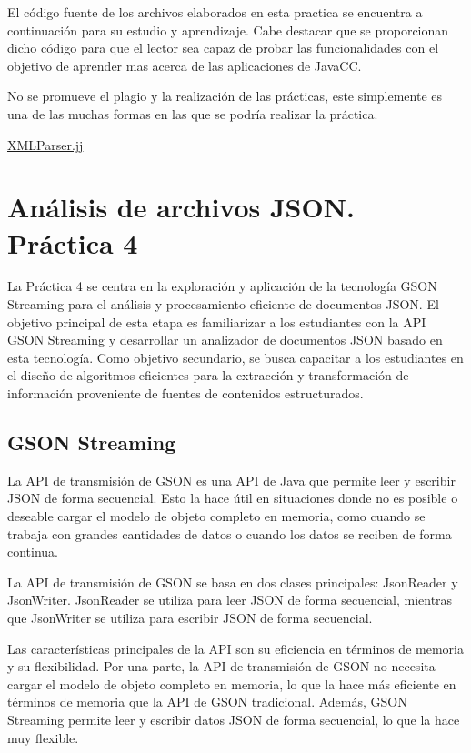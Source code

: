 \noindent El código fuente de los archivos elaborados en esta practica se encuentra a continuación para su estudio y aprendizaje. Cabe destacar que se proporcionan dicho código para que el lector sea capaz de probar las funcionalidades con el objetivo de aprender mas acerca de las aplicaciones de JavaCC.

No se promueve el plagio y la realización de las prácticas, este simplemente es una de las muchas formas en las que se podría realizar la práctica.

\hyperref[sec:XMLParser]{XMLParser.jj}

\section{Análisis de archivos JSON. Práctica 4}

\noindent La Práctica 4 se centra en la exploración y aplicación de la tecnología GSON Streaming para el análisis y procesamiento eficiente de documentos JSON. El objetivo principal de esta etapa es familiarizar a los estudiantes con la API GSON Streaming y desarrollar un analizador de documentos JSON basado en esta tecnología. Como objetivo secundario, se busca capacitar a los estudiantes en el diseño de algoritmos eficientes para la extracción y transformación de información proveniente de fuentes de contenidos estructurados.

\subsection{GSON Streaming}

\noindent La API de transmisión de GSON es una API de Java que permite leer y escribir JSON de forma secuencial. Esto la hace útil en situaciones donde no es posible o deseable cargar el modelo de objeto completo en memoria, como cuando se trabaja con grandes cantidades de datos o cuando los datos se reciben de forma continua.

La API de transmisión de GSON se basa en dos clases principales: JsonReader y JsonWriter. JsonReader se utiliza para leer JSON de forma secuencial, mientras que JsonWriter se utiliza para escribir JSON de forma secuencial.

Las características principales de la API son su eficiencia en términos de memoria y  su flexibilidad. Por una parte, la API de transmisión de GSON no necesita cargar el modelo de objeto completo en memoria, lo que la hace más eficiente en términos de memoria que la API de GSON tradicional. Además, GSON Streaming permite leer y escribir datos JSON de forma secuencial, lo que la hace muy flexible.

